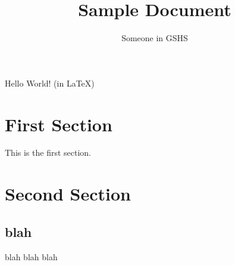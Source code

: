 \documentclass{article}
\title{Sample Document}
\author{Someone in GSHS}
\begin{document}
	
	\maketitle
	\tableofcontents
	
	Hello World! (in \LaTeX)
	
	\section{First Section}
	This is the first section.
	
	\section{Second Section}
	\subsection{blah}
	blah blah blah
	
\end{document}
